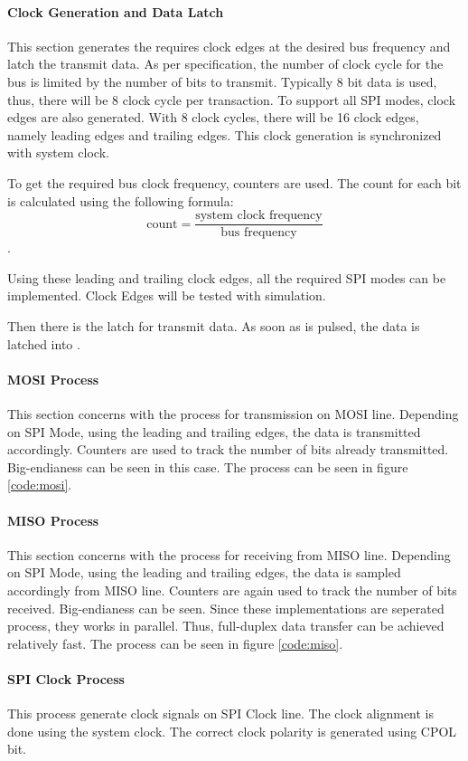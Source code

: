 \paragraph*{Clock Generation and Data Latch}
This section generates the requires clock edges at the desired bus frequency and latch the transmit data. As per specification, the number of clock cycle for the bus is limited by the number of bits to transmit. Typically 8 bit data is used, thus, there will be 8 clock cycle per transaction. To support all SPI modes, clock edges are also generated. With 8 clock cycles, there will be 16 clock edges, namely leading edges and trailing edges. This clock generation is synchronized with system clock. 

To get the required bus clock frequency, counters are used. The count for each bit is calculated using the following formula: $$\text{count} = \frac{\text{system clock frequency}}{\text{bus frequency}}$$.

Using these leading and trailing clock edges, all the required SPI modes can be implemented. Clock Edges will be tested with simulation.

Then there is the latch for transmit data. As soon as  is pulsed, the data is latched into .

\newpage
\paragraph*{MOSI Process}
This section concerns with the process for transmission on MOSI line. Depending on SPI Mode, using the leading and trailing  edges, the data is transmitted accordingly. Counters are used to track the number of bits already transmitted. Big-endianess can be seen in this case. The process can be seen in figure \ref{code:mosi}.


\paragraph*{MISO Process}
This section concerns with the process for receiving from MISO line. Depending on SPI Mode, using the leading and trailing edges, the data is sampled accordingly from MISO line. Counters are again used to track the number of bits received. Big-endianess can be seen. Since these implementations are seperated process, they works in parallel. Thus, full-duplex data transfer can be achieved relatively fast. The process can be seen in figure \ref{code:miso}.

\newpage
\paragraph*{SPI Clock Process}
This process generate clock signals on SPI Clock line. The clock alignment is done using the system clock. The correct clock polarity is generated using CPOL bit.
